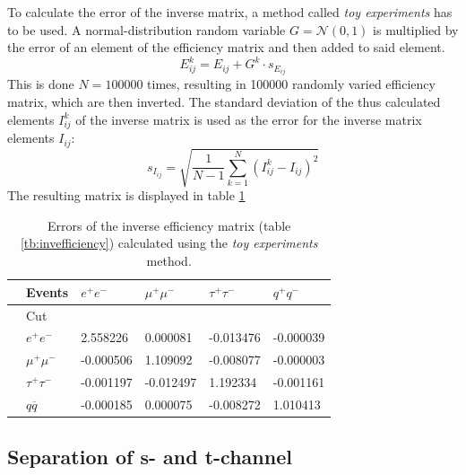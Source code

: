 To calculate the error of the inverse matrix, a method called \emph{toy experiments} has to be used. A normal-distribution random variable $G=\mathcal{N}(0,1)$ is multiplied by the error of an element of the efficiency matrix and then added to said element.
\begin{equation}
E^{k}_{ij}=E_{ij}+G^k\cdot s_{E_{ij}}
\end{equation}
This is done $N=100000$ times, resulting in 100000 randomly varied efficiency matrix, which are then inverted. The standard deviation of the thus calculated elements $I^k_{ij}$ of the inverse matrix is used as the error for the inverse matrix elements $I_{ij}$: 
\begin{equation}
s_{I_{ij}}=\sqrt{\frac{1}{N-1}\sum_{k=1}^{N}\left(I^k_{ij}-I_{ij}\right)^2}
\end{equation}
The resulting matrix is displayed in table \ref{tb:invefficiencyerror}
\begin{table}[H]\centering
	\begin{tabular}{@{}llllll@{}}
		\toprule
		&Events &$e^+e^-$&$\mu^+\mu^-$&$\tau^+\tau^-$&$q^+q^-$\\
		\midrule
		&Cut&&&&\\
		&$e^+e^-$&2.558226&0.000081&-0.013476&-0.000039\\
		&$\mu^+\mu^-$&-0.000506&1.109092&-0.008077&-0.000003\\
		&$\tau^+\tau^-$&-0.001197&-0.012497&1.192334&-0.001161\\
		&$q\overline{q}$&-0.000185&0.000075&-0.008272&1.010413\\
		\bottomrule
	\end{tabular}
	\caption[Inverse efficiency error matrix]{Errors of the inverse efficiency matrix (table \ref{tb:invefficiency}) calculated using the \emph{toy experiments} method.}
	\label{tb:invefficiencyerror}
\end{table}

\subsection{Separation of s- and t-channel}
